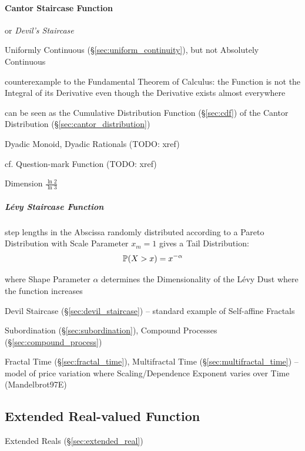 \paragraph{Cantor Staircase Function}\label{sec:cantor_staircase}\hfill

or \emph{Devil's Staircase}

Uniformly Continuous (\S\ref{sec:uniform_continuity}), but not Absolutely
Continuous

counterexample to the Fundamental Theorem of Calculus: the Function is not the
Integral of its Derivative even though the Derivative exists almost everywhere

can be seen as the Cumulative Distribution Function (\S\ref{sec:cdf}) of the
Cantor Distribution (\S\ref{sec:cantor_distribution})

Dyadic Monoid, Dyadic Rationals (TODO: xref)

cf. Question-mark Function (TODO: xref)

Dimension $\frac{\ln 2}{\ln 3}$



\subparagraph{L\'evy Staircase Function}\label{sec:levy_staircase}\hfill

step lengths in the Abscissa randomly distributed according to a Pareto
Distribution with Scale Parameter $x_m = 1$ gives a Tail Distribution:
\[
  \mathbb{P}(X > x) = x^{-\alpha}
\]

where Shape Parameter $\alpha$ determines the Dimensionality of the L\'evy Dust
where the function increases

\fist Devil Staircase (\S\ref{sec:devil_staircase}) -- standard example of
Self-affine Fractals

Subordination (\S\ref{sec:subordination}), Compound Processes
(\S\ref{sec:compound_process})

Fractal Time (\S\ref{sec:fractal_time}), Multifractal Time
(\S\ref{sec:multifractal_time}) -- model of price variation where
Scaling/Dependence Exponent varies over Time (Mandelbrot97E)



\subsection{Extended Real-valued Function}\label{sec:extended_real_valued}

Extended Reals (\S\ref{sec:extended_real})



